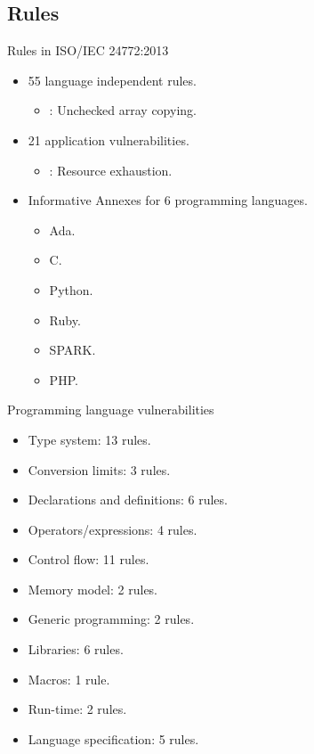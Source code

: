 \subsection{Rules}

\begin{frame}[t]{Rules in ISO/IEC 24772:2013}
\begin{itemize}
  \item 55 language independent rules.
    \begin{itemize}
      \item {}: Unchecked array copying.
    \end{itemize}

  \vfill\pause
  \item 21 application vulnerabilities.
    \begin{itemize}
      \item {}: Resource exhaustion.
    \end{itemize}

  \vfill\pause
  \item Informative Annexes for 6 programming languages.
    \begin{itemize}
         \item Ada.
         \item C.
         \item Python.
         \item Ruby.
         \item SPARK.
         \item PHP.
    \end{itemize}
\end{itemize}
\end{frame}

\begin{frame}[t]{Programming language vulnerabilities}
\begin{itemize}
  \item Type system: 13 rules.
  \item Conversion limits: 3 rules.
  \item Declarations and definitions: 6 rules.
  \item Operators/expressions: 4 rules.
  \item Control flow: 11 rules.
  \item Memory model: 2 rules.
  \item Generic programming: 2 rules.
  \item Libraries: 6 rules.
  \item Macros: 1 rule.
  \item Run-time: 2 rules.
  \item Language specification: 5 rules.
\end{itemize}
\end{frame}

